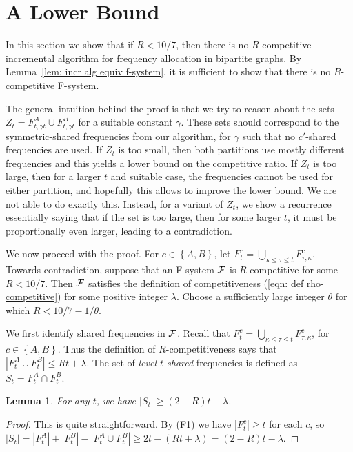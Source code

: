 \documentclass[11pt]{article}
\newcommand{\calF}{{\cal F}}
\newcommand{\braced}[1]{{ \left\{ #1 \right\} }}
\newtheorem{lemma}[theorem]{Lemma}
\begin{document}
\section{A Lower Bound}
\label{sec: a lower bound}

In this section we show that if $R < 10/7$, then there is no $R$-competitive 
incremental algorithm for frequency allocation in bipartite graphs.
By Lemma~\ref{lem: incr alg equiv f-system}, it is sufficient to
show that there is no $R$-competitive F-system. 

The general intuition behind the proof is that we try to reason about
the sets $Z_t=F^A_{t,\gamma t}\cup F^B_{t,\gamma t}$ for a suitable
constant $\gamma$.  These sets should correspond to the
symmetric-shared frequencies from our algorithm, for $\gamma$ such
that no $c'$-shared frequencies are used. If $Z_t$ is too small, then
both partitions use mostly different frequencies and this yields a
lower bound on the competitive ratio. If $Z_t$ is too large, then for
a larger $t$ and suitable case, the frequencies cannot be used for
either partition, and hopefully this allows to improve the lower
bound. We are not able to do exactly this. Instead, for a variant of
$Z_t$, we show a recurrence essentially saying that if the set is too
large, then for some larger $t$, it must be proportionally even
larger, leading to a contradiction.


We now proceed with the proof.  For $c\in\braced{A,B}$, let $F^c_t =
\bigcup_{\kappa\le\tau\le t} F^c_{\tau,\kappa}$. Towards
contradiction, suppose that an F-system $\calF$ is $R$-competitive for
some $R < 10/7$. Then $\calF$ satisfies the definition of
competitiveness (\ref{eqn: def rho-competitive}) for some positive
integer $\lambda$. Choose a sufficiently large integer $\theta$ for
which $R < 10/7 - 1/\theta$.

We first identify shared frequencies in $\calF$. Recall that 
$F^c_t = \bigcup_{\kappa\le\tau\le t} F^c_{\tau,\kappa}$,  for $c\in\braced{A,B}$.
Thus the definition of $R$-competitiveness says that
$|F^A_t\cup F^B_t| \le Rt+\lambda$. The set of \emph{level-$t$ shared} 
frequencies is defined as $S_t = F^A_t\cap F^B_t$.



\begin{lemma}\label{lem: shared lower bound}
For any $t$, we have $|S_t|\geq (2-R)t-\lambda$.
\end{lemma}

\begin{proof}
This is quite straightforward.  By (F1) we have
$|F^c_t|\ge t$ for each $c$, so
$|S_t| = |F^A_t|+|F^B_t| - |F^A_t\cup F^B_t|
	\geq 2t-(Rt+\lambda) 
	= (2-R)t-\lambda$.
\end{proof}
\end{document}
